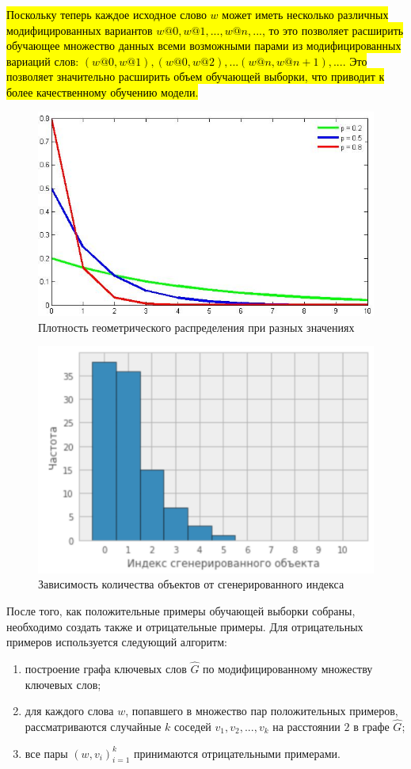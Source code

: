 \hl{Поскольку теперь каждое исходное слово $w$ может иметь несколько различных модифицированных вариантов $w@0, w@1, ..., w@n, ...$, то это позволяет расширить обучающее множество данных всеми возможными парами из модифицированных вариаций слов: $(w@0, w@1), (w@0, w@2), ... (w@n, w@n+1), ...$. Это позволяет значительно расширить объем обучающей выборки, что приводит к более качественному обучению модели.}


\begin{figure}[ht]
  \begin{minipage}[ht]{1.0\linewidth}\centering
    \includegraphics[width=0.7\linewidth]{Dissertation/pics/geom_distr}
    \caption{Плотность геометрического распределения при разных значениях}
  \end{minipage}
  \label{img:geom_distr}
\end{figure}

\begin{figure}[ht]
  \begin{minipage}[ht]{1.0\linewidth}\centering
    \includegraphics[width=0.7\linewidth]{Dissertation/pics/geom_distr_2}
    \caption{Зависимость количества объектов от сгенерированного индекса}
  \end{minipage}
  \label{img:geom_distr_2}
\end{figure}
После того, как положительные примеры обучающей выборки собраны, необходимо создать также и отрицательные примеры. Для отрицательных примеров используется следующий алгоритм:
\begin{enumerate}
    \item построение графа ключевых слов $\hat{G}$ по модифицированному множеству ключевых слов;
    \item для каждого слова $w$, попавшего в множество пар положительных примеров, рассматриваются случайные $k$ соседей $v_1, v_2, ..., v_k$ на расстоянии $2$ в графе $\hat{G}$;
    \item все пары $(w, v_i)_{i=1}^k$ принимаются отрицательными примерами.
\end{enumerate}

